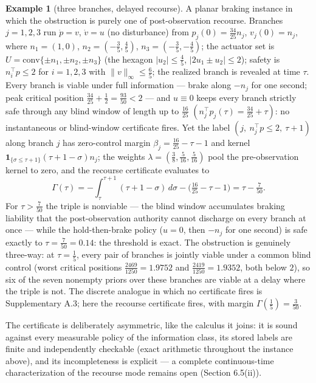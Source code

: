 \documentclass[10pt,twocolumn]{article}
\theoremstyle{definition}
\newtheorem{example}{Example}
\begin{document}
\begin{example}[three branches, delayed recourse]\label{ex:three-branch}
A planar braking instance in which the obstruction is purely one of
post-observation recourse. Branches \(j = 1, 2, 3\) run \(\dot p = v\),
\(\dot v = u\) (no disturbance) from
\(p_j(0) = \tfrac{34}{25} n_j\), \(v_j(0) = n_j\), where
\(n_1 = (1, 0)\), \(n_2 = (-\tfrac{3}{5}, \tfrac{4}{5})\),
\(n_3 = (-\tfrac{3}{5}, -\tfrac{4}{5})\); the actuator set is
\(U = \mathrm{conv}\{\pm n_1, \pm n_2, \pm n_3\}\) (the hexagon
\(|u_2| \le \tfrac45\), \(|2u_1 \pm u_2| \le 2\)); safety is
\(n_i^{\top} p \le 2\) for \(i = 1, 2, 3\) with
\(\|v\|_\infty \le \tfrac65\); the realized branch is revealed at time
\(\tau\). Every branch is viable under full information --- brake along
\(-n_j\) for one second; peak critical position
\(\tfrac{34}{25} + \tfrac12 = \tfrac{93}{50} < 2\) --- and \(u \equiv 0\)
keeps every branch strictly safe through any blind window of length up to
\(\tfrac{16}{25}\) \((n_j^{\top} p_j(\tau) = \tfrac{34}{25} + \tau)\):
no instantaneous or blind-window certificate fires. Yet the label
\((j,\ n_j^{\top} p \le 2,\ \tau + 1)\) along branch \(j\) has
zero-control margin \(\beta_j = \tfrac{16}{25} - \tau - 1\) and kernel
\(\mathbf{1}_{\{\sigma \le \tau + 1\}} (\tau + 1 - \sigma) n_j\); the
weights \(\lambda = (\tfrac38, \tfrac5{16}, \tfrac5{16})\) pool the
pre-observation kernel to zero, and the recourse certificate evaluates to
\[\Gamma(\tau) = -\int_{\tau}^{\tau+1} (\tau + 1 - \sigma)\, d\sigma
- \Big(\tfrac{16}{25} - \tau - 1\Big) = \tau - \tfrac{7}{50}.\]
For \(\tau > \tfrac{7}{50}\) the triple is nonviable --- the blind window
accumulates braking liability that the post-observation authority cannot
discharge on every branch at once --- while the hold-then-brake policy
(\(u = 0\), then \(-n_j\) for one second) is safe exactly to
\(\tau = \tfrac{7}{50} = 0.14\): the threshold is exact. The obstruction
is genuinely three-way: at \(\tau = \tfrac15\), every pair of branches is
jointly viable under a common blind control (worst critical positions
\(\tfrac{2469}{1250} = 1.9752\) and \(\tfrac{2419}{1250} = 1.9352\), both
below \(2\)), so six of the seven nonempty priors over these branches are
viable at a delay where the triple is not. The discrete analogue in which no
certificate fires is Supplementary A.3; here the recourse certificate fires,
with margin \(\Gamma(\tfrac15) = \tfrac3{50}\).
\end{example}

The certificate is deliberately asymmetric, like the calculus it joins: it is
sound against every measurable policy of the information class, its stored
labels are finite and independently checkable (exact arithmetic throughout the
instance above), and its incompleteness is explicit --- a complete
continuous-time characterization of the recourse mode remains open
(Section 6.5(ii)).
\end{document}
